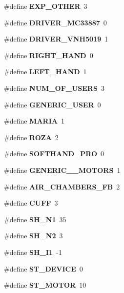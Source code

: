 \begin{DoxyCompactItemize}
\#define {\bfseries E\+X\+P\+\_\+\+O\+T\+H\+ER}~3
\item 
\mbox{\label{globals_8h_a20e659d92cc540a195717f8cc2dd4b42}} 
\#define {\bfseries D\+R\+I\+V\+E\+R\+\_\+\+M\+C33887}~0
\item 
\mbox{\label{globals_8h_a2e6a13011f6123a8f0c064e37b116880}} 
\#define {\bfseries D\+R\+I\+V\+E\+R\+\_\+\+V\+N\+H5019}~1
\item 
\mbox{\label{globals_8h_a5d1d275cfec76197e014fe4d58f2e569}} 
\#define {\bfseries R\+I\+G\+H\+T\+\_\+\+H\+A\+ND}~0
\item 
\mbox{\label{globals_8h_a2eff09387fb5d20d8af4fa186ae37c4d}} 
\#define {\bfseries L\+E\+F\+T\+\_\+\+H\+A\+ND}~1
\item 
\mbox{\label{globals_8h_aa518fecbba4980ebda2090f02ceb5e52}} 
\#define {\bfseries N\+U\+M\+\_\+\+O\+F\+\_\+\+U\+S\+E\+RS}~3
\item 
\mbox{\label{globals_8h_ac524d0f906498efbd1182856cd8c80de}} 
\#define {\bfseries G\+E\+N\+E\+R\+I\+C\+\_\+\+U\+S\+ER}~0
\item 
\mbox{\label{globals_8h_a8595fed7fe248547047c468802057a0d}} 
\#define {\bfseries M\+A\+R\+IA}~1
\item 
\mbox{\label{globals_8h_a7617063d52fc2d1ba6d0276770aec732}} 
\#define {\bfseries R\+O\+ZA}~2
\item 
\mbox{\label{globals_8h_a47a1fa8e1e5435f664749ab44e163bae}} 
\#define {\bfseries S\+O\+F\+T\+H\+A\+N\+D\+\_\+\+P\+RO}~0
\item 
\mbox{\label{globals_8h_a577f879b1a05acd55b1d56412a17e13f}} 
\#define {\bfseries G\+E\+N\+E\+R\+I\+C\+\_\+\_\+\+M\+O\+T\+O\+RS}~1
\item 
\mbox{\label{globals_8h_ad854ddb03952eb3f1d2e2282bbf21eb4}} 
\#define {\bfseries A\+I\+R\+\_\+\+C\+H\+A\+M\+B\+E\+R\+S\+\_\+\+FB}~2
\item 
\mbox{\label{globals_8h_ac5a0bd9be15f1dcd0ba86f27d3dbda50}} 
\#define {\bfseries C\+U\+FF}~3
\item 
\#define \textbf{ S\+H\+\_\+\+N1}~35
\item 
\#define \textbf{ S\+H\+\_\+\+N2}~3
\item 
\#define \textbf{ S\+H\+\_\+\+I1}~-\/1
\item 
\mbox{\label{globals_8h_a5f8f4a24628c7191c9adde97ae751bf2}} 
\#define {\bfseries S\+T\+\_\+\+D\+E\+V\+I\+CE}~0
\item 
\mbox{\label{globals_8h_a911881bfa4a82a79f351f7a8a8ea40d1}} 
\#define {\bfseries S\+T\+\_\+\+M\+O\+T\+OR}~10
\item 

\end{DoxyCompactItemize}
